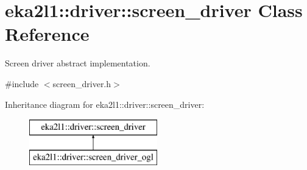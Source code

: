 \hypertarget{classeka2l1_1_1driver_1_1screen__driver}{}\section{eka2l1\+:\+:driver\+:\+:screen\+\_\+driver Class Reference}
\label{classeka2l1_1_1driver_1_1screen__driver}


Screen driver abstract implementation.  




{\ttfamily \#include $<$screen\+\_\+driver.\+h$>$}

Inheritance diagram for eka2l1\+:\+:driver\+:\+:screen\+\_\+driver\+:\begin{figure}[H]
\begin{center}
\leavevmode
\includegraphics[height=2.000000cm]{classeka2l1_1_1driver_1_1screen__driver}
\end{center}
\end{figure}
